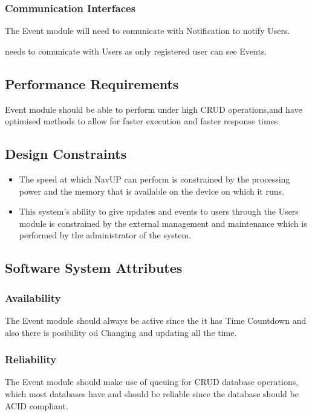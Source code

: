 	\subsubsection{Communication Interfaces } 

	\item The Event module will need to comunicate with Notification to notify Users.
	\item needs to comunicate with Users as only registered user can see Events.



	
\subsection{Performance Requirements}
Event module should be able to perform under high CRUD operations,and have optimised methods to allow for faster execution and faster response times.


\subsection{Design Constraints}
\begin{itemize}

\item The speed at which NavUP can perform is constrained by the processing power and the  memory that is available on the device on which it runs.

\item This system’s ability to give updates and events to users through the Users module is constrained by the external management and maintenance which is performed by the administrator of the system.

\end{itemize}


\subsection{Software System Attributes} 
\subsubsection{Availability}
The Event module should always be active since the it has Time Countdown and also there is posibility od Changing and updating all the time. 
\subsubsection{Reliability}
The Event module should make use of queuing for CRUD database operations, which most databases have and should be reliable since the database should be ACID compliant.

